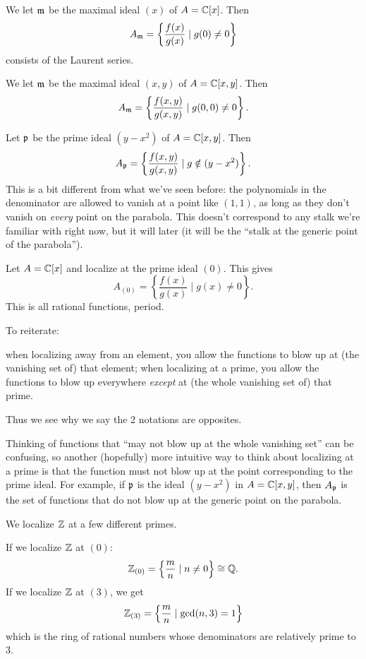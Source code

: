 \begin{example}
	\listhack
	\begin{enumerate}[(a)]
		\ii We let $\mathfrak m$ be the maximal ideal $(x)$ of $A = \mathbb C[x]$.
		Then \[ A_\mathfrak m = \left\{ \frac{f(x)}{g(x)} \mid g(0) \neq 0 \right\} \]
		consists of the Laurent series.

		\ii We let $\mathfrak m$ be the maximal ideal $(x,y)$ of $A = \mathbb C[x,y]$.
		Then \[ A_\mathfrak m = \left\{ \frac{f(x,y)}{g(x,y)} \mid g(0,0) \neq 0 \right\}. \]

		\ii Let $\mathfrak p$ be the prime ideal $(y-x^2)$ of $A = \mathbb C[x,y]$.
		Then
		\[ A_\mathfrak p = \left\{ \frac{f(x,y)}{g(x,y)} \mid g \notin (y-x^2) \right\}. \]
		This is a bit different from what we've seen before:
		the polynomials in the denominator are allowed to vanish
		at a point like $(1,1)$, as long as they don't vanish on
		\emph{every} point on the parabola.
		This doesn't correspond to any stalk we're familiar with right now,
		but it will later
		(it will be the ``stalk at the generic point of the parabola'').

		\ii Let $A = \mathbb C[x]$ and localize at the prime ideal $(0)$.
		This gives \[ A_{(0)} = \left\{ \frac{f(x)}{g(x)} \mid g(x) \neq 0 \right\}. \]
		This is all rational functions, period.
	\end{enumerate}
\end{example}

\begin{remark*}
	To reiterate:
	\begin{itemize}
	\ii when localizing away from an element,
	you allow the functions to blow up at (the vanishing set of) that element;
	\ii when localizing at a prime,
	you allow the functions to blow up everywhere
	\emph{except} at (the whole vanishing set of) that prime.
	\end{itemize}
	Thus we see why we say the 2 notations are opposites.

	Thinking of functions that ``may not blow up at the whole vanishing set''
	can be confusing, so another (hopefully) more intuitive way to think
	about localizing at a prime is that the function
	must not blow up at the point corresponding to the prime ideal.
	For example, if $\mathfrak p$ is the ideal $(y-x^2)$ in $A = \mathbb C[x,y]$,
	then $A_\mathfrak p$ is the set of functions that do not blow up at the
	generic point on the parabola.
\end{remark*}

\begin{example}
	We localize $\mathbb Z$ at a few different primes.
	\begin{enumerate}[(a)]
		\ii If we localize $\mathbb Z$ at $(0)$:
		\[ \mathbb Z_{(0)} = \left\{ \frac mn \mid n \neq 0 \right\}
			\cong \mathbb Q. \]
		\ii If we localize $\mathbb Z$ at $(3)$, we get
		\[ \mathbb Z_{(3)} = \left\{ \frac mn \mid \gcd(n,3) = 1 \right\} \]
		which is the ring of rational numbers
		whose denominators are relatively prime to $3$.
	\end{enumerate}
\end{example}

